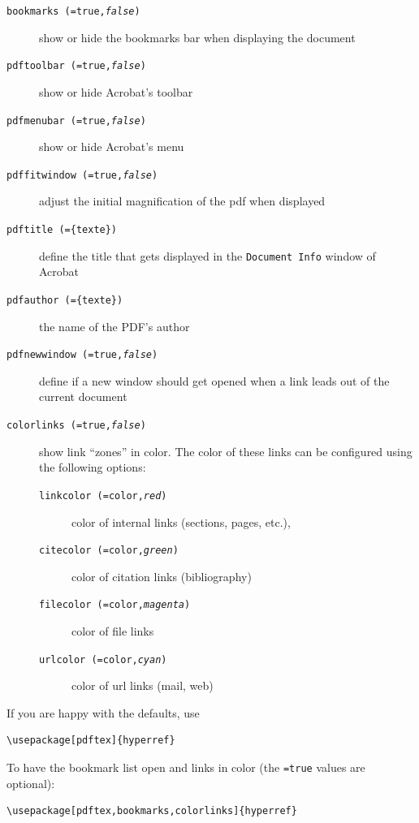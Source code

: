 \documentclass[twoside,11pt,letterpaper]{article}
\begin{document}
\begin{description}
  \item[\texttt{bookmarks (=true,\textit{false})}] show or hide the
    bookmarks bar when displaying the document
  \item [\texttt{pdftoolbar (=true,\textit{false})}] show or hide
    Acrobat's toolbar
  \item [\texttt{pdfmenubar (=true,\textit{false})}] show or hide
    Acrobat's menu
  \item [\texttt{pdffitwindow (=true,\textit{false})}] adjust the
    initial magnification of the pdf when displayed
  \item [\texttt{pdftitle (=\{texte\})}] define the title that gets
    displayed in the \texttt{Document Info} window of Acrobat
  \item [\texttt{pdfauthor (=\{texte\})}] the name of the PDF's author
  \item [\texttt{pdfnewwindow (=true,\textit{false})}] define if a new
    window should get opened when a link leads out of the current
    document
  \item [\texttt{colorlinks (=true,\textit{false})}] show link
    ``zones'' in color. The color of these links can be configured
    using the following options:
    \begin{description}
    \item [\texttt{linkcolor (=color,\textit{red})}] color of internal
      links (sections, pages, etc.),
    \item [\texttt{citecolor (=color,\textit{green})}] color of
      citation links (bibliography)
    \item [\texttt{filecolor (=color,\textit{magenta})}] color of file
      links
    \item [\texttt{urlcolor (=color,\textit{cyan})}] color of url
      links (mail, web)
    \end{description}
\end{description}

\vspace{\baselineskip}

If you are happy with the defaults, use
\begin{code}
\begin{verbatim}
\usepackage[pdftex]{hyperref}
\end{verbatim}
\end{code}

To have the bookmark list open and links in color
(the \texttt{=true} values are optional):
\begin{code}
\begin{verbatim}
\usepackage[pdftex,bookmarks,colorlinks]{hyperref}
\end{verbatim}
\end{code}
\end{document}
